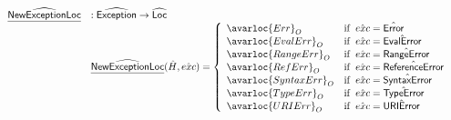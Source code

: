 \[\begin{array}{ll}
\ahf{NewExceptionLoc} & : \abs{Exception} \rightarrow \abs{Loc} \\
 & \ahf{NewExceptionLoc}(\hat{H},\hat{exc}) =
 \left\{
   \begin{array}{ll}
     \avarloc{Err}_O & \ifc{\hat{exc} = \hat{\exc{Error}}} \\
     \avarloc{EvalErr}_O & \ifc{\hat{exc} = \hat{\exc{EvalError}}} \\
     \avarloc{RangeErr}_O & \ifc{\hat{exc} = \hat{\exc{RangeError}}} \\
     \avarloc{RefErr}_O & \ifc{\hat{exc} = \hat{\exc{ReferenceError}}} \\
     \avarloc{SyntaxErr}_O & \ifc{\hat{exc} = \hat{\exc{SyntaxError}}} \\
     \avarloc{TypeErr}_O & \ifc{\hat{exc} = \hat{\exc{TypeError}}} \\
     \avarloc{URIErr}_O & \ifc{\hat{exc} = \hat{\exc{URIError}}} \\
   \end{array}
 \right.\\
\\
\end{array}
\]
\\

